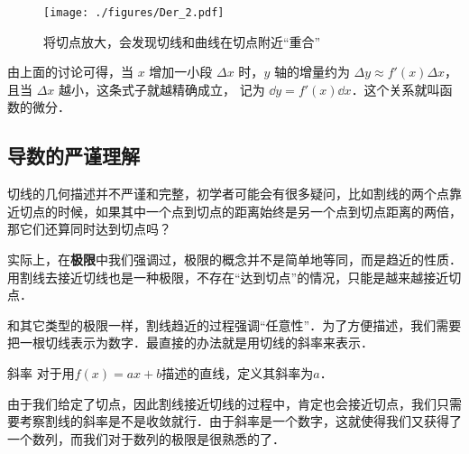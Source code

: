 \begin{figure}[ht]
\centering
\texttt{[image: ./figures/Der\_2.pdf]}
\caption{将切点放大，会发现切线和曲线在切点附近“重合”}
\end{figure}

由上面的讨论可得，当 $x$ 增加一小段 $\Delta x$ 时，$y$ 轴的增量约为 $\Delta y \approx f'(x)\Delta x$，且当 $\Delta x$ 越小，这条式子就越精确成立， 记为 $\dd{y} = f'(x) \dd{x}$．这个关系就叫函数的微分．

\subsection{导数的严谨理解}



切线的几何描述并不严谨和完整，初学者可能会有很多疑问，比如割线的两个点靠近切点的时候，如果其中一个点到切点的距离始终是另一个点到切点距离的两倍，那它们还算同时达到切点吗？

实际上，在\textbf{极限}中我们强调过，极限的概念并不是简单地等同，而是趋近的性质．用割线去接近切线也是一种极限，不存在“达到切点”的情况，只能是越来越接近切点．

和其它类型的极限一样，割线趋近的过程强调“任意性”．为了方便描述，我们需要把一根切线表示为数字．最直接的办法就是用切线的斜率来表示．

\begin{definition}{斜率}
对于用$f(x)=ax+b$描述的直线，定义其斜率为$a$．
\end{definition}

由于我们给定了切点，因此割线接近切线的过程中，肯定也会接近切点，我们只需要考察割线的斜率是不是收敛就行．由于斜率是一个数字，这就使得我们又获得了一个数列，而我们对于数列的极限是很熟悉的了．

